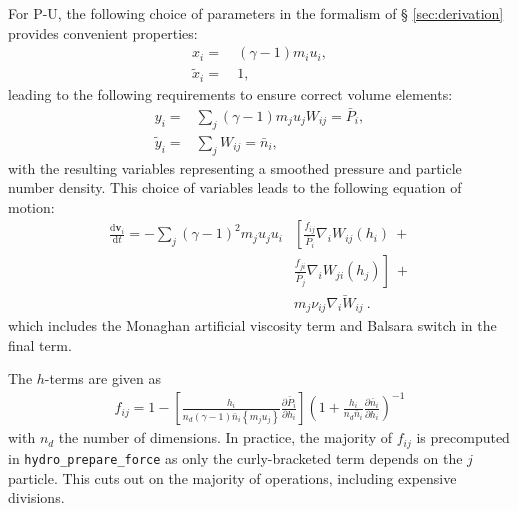 For P-U, the following choice of parameters in the formalism of \S
\ref{sec:derivation} provides convenient properties:
\begin{align}
  x_i =&~ (\gamma - 1) m_i u_i, \\
  \tilde{x}_i =&~ 1,
  \label{eq:sph:pu:xichoice}
\end{align}
leading to the following requirements to ensure correct volume elements:
\begin{align}
  y_i =& \sum_{j} (\gamma - 1) m_j u_j W_{ij} = \bar{P}_i,\\
  \tilde{y}_i =& \sum_{j} W_{ij} = \bar{n}_i,
  \label{eq:sph:pu:yichoice}
\end{align}
with the resulting variables representing a smoothed pressure and particle
number density. This choice of variables leads to the following equation of
motion:
\begin{align}
  \frac{\mathrm{d} \mathbf{v}_i}{\mathrm{d} t} = -\sum_j (\gamma - 1)^2 m_j u_j
u_i
	 &\left[\frac{f_{ij}}{\bar{P}_i} \nabla_i W_{ij}(h_i) ~+ \right. \nonumber \\
	       &\left.\frac{f_{ji}}{\bar{P}_j} \nabla_i W_{ji}(h_j)\right] ~+ \nonumber \\
	       & m_j \nu_{ij}\bar{\nabla_i W_{ij}}~.
  \label{eq:sph:pu:eom}
\end{align}
which includes the Monaghan artificial viscosity term and Balsara switch in
the final term.

The $h$-terms are given as
\begin{align}
  f_{ij} = 1 - \left[\frac{h_i}{n_d (\gamma - 1) \bar{n}_i \left\{m_j
u_j\right\}}
		   \frac{\partial \bar{P}_i}{\partial h_i} \right]
		   \left( 1 + \frac{h_i}{n_d \bar{n}_i}
		   \frac{\partial \bar{n}_i}{\partial h_i} \right)^{-1}
  \label{eq:sph:pu:fij}
\end{align}
with $n_d$ the number of dimensions. In practice, the majority of $f_{ij}$ is
precomputed in {\tt hydro\_prepare\_force} as only the curly-bracketed term
depends on the $j$ particle. This cuts out on the majority of operations,
including expensive divisions.

